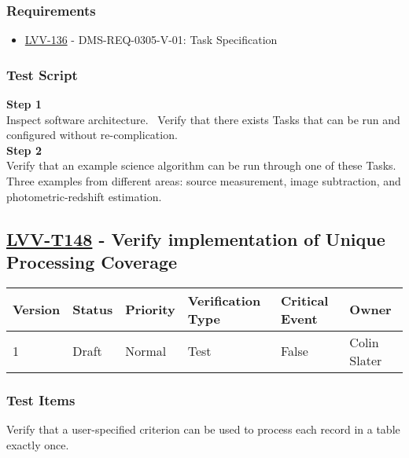 \subsubsection{Requirements}\label{requirements-16}

\begin{itemize}
\tightlist
\item
  \href{https://jira.lsstcorp.org/browse/LVV-136}{LVV-136} -
  DMS-REQ-0305-V-01: Task Specification
\end{itemize}

\subsubsection{Test Script}\label{test-script-16}

\textbf{Step 1}\\
Inspect software architecture. ~Verify that there exists Tasks that can
be run and configured without
re-complication.\\[2\baselineskip]\textbf{Step 2}\\
Verify that an example science algorithm can be run through one of these
Tasks.~ Three examples from different areas: source measurement, image
subtraction, and photometric-redshift estimation.\\[2\baselineskip]

\hypertarget{lvv-t148---verify-implementation-of-unique-processing-coverage}{\subsection{\texorpdfstring{\href{https://jira.lsstcorp.org/secure/Tests.jspa\#/testCase/LVV-T148}{LVV-T148}
- Verify implementation of Unique Processing
Coverage}{LVV-T148 - Verify implementation of Unique Processing Coverage}}\label{lvv-t148---verify-implementation-of-unique-processing-coverage}}

\begin{longtable}[]{@{}llllll@{}}
\toprule
Version & Status & Priority & Verification Type & Critical Event &
Owner\tabularnewline
\midrule
\endhead
1 & Draft & Normal & Test & False & Colin Slater\tabularnewline
\bottomrule
\end{longtable}

\subsubsection{Test Items}\label{test-items-17}

Verify that a user-specified criterion can be used to process each
record in a table exactly once.

